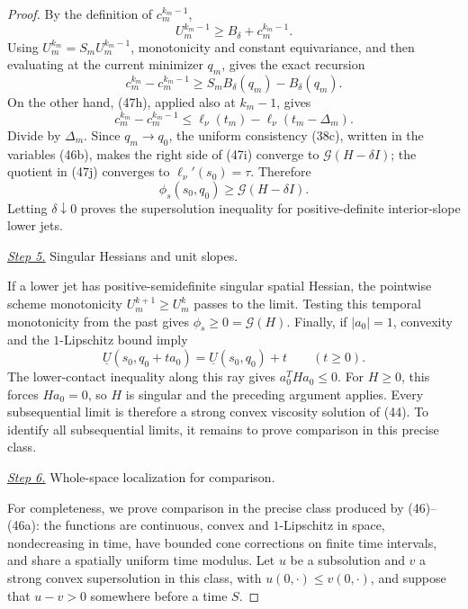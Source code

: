 \documentclass{smfart}
\theoremstyle{definition}
\newcommand{\1}{\mathbf 1}
\begin{document}
\begin{proof}
By the definition of $c_ m^{k_ m-1}$,
\begin{equation*}
U_ m^{k_ m-1}\geq B_ \delta+c_ m^{k_ m-1}.
\end{equation*}
Using $U_ m^{k_ m}=S_ mU_ m^{k_ m-1}$, monotonicity and constant
equivariance, and then evaluating at the current minimizer $q_ m$,
gives the exact recursion
\begin{equation}
c_ m^{k_ m}-c_ m^{k_ m-1}
\geq S_ mB_ \delta(q_ m)-B_ \delta(q_ m).
\tag{47i}
\end{equation}
On the other hand, (47h), applied also at $k_ m-1$, gives
\begin{equation}
c_ m^{k_ m}-c_ m^{k_ m-1}
\leq\ell_ \nu(t_ m)-\ell_ \nu(t_ m-\Delta_ m).
\tag{47j}
\end{equation}
Divide by $\Delta_ m$.  Since $q_ m\to q_ 0$, the uniform consistency
(38c), written in the variables (46b), makes the right side of (47i)
converge to $\mathcal G(H-\delta I)$; the quotient in (47j) converges to
$\ell_ \nu'(s_ 0)=\tau$.  Therefore
\begin{equation*}
\phi_ s(s_ 0,q_ 0)\geq \mathcal G(H-\delta I).
\end{equation*}
Letting $\delta\downarrow0$ proves the supersolution inequality for
positive-definite interior-slope lower jets.

\smallskip\noindent
\underline{\textit{Step 5.}} Singular Hessians and unit slopes.

If a lower jet has positive-semidefinite singular spatial Hessian, the
pointwise scheme monotonicity $U_ m^{k+1}\geq U_ m^k$ passes to the
limit.  Testing this temporal monotonicity from the past gives
$\phi_ s\geq0=\mathcal G(H)$.  Finally, if $|a_ 0|=1$, convexity and the
$1$-Lipschitz bound imply
\begin{equation*}
\underline U(s_ 0,q_ 0+ta_ 0)=\underline U(s_ 0,q_ 0)+t
\qquad(t\geq0).
\end{equation*}
The lower-contact inequality along this ray gives
$a_ 0^THa_ 0\leq0$.  For $H\geq0$, this forces $Ha_ 0=0$, so $H$
is singular and the preceding argument applies.  Every subsequential
limit is therefore a strong convex viscosity solution of (44).  To
identify all subsequential limits, it remains to prove comparison in
this precise class.

\smallskip\noindent
\underline{\textit{Step 6.}} Whole-space localization for comparison.

For completeness, we prove comparison in the precise class produced by
(46)--(46a): the functions are continuous, convex and $1$-Lipschitz
in space, nondecreasing in time, have bounded cone corrections on
finite time intervals, and share a spatially uniform time modulus.
Let $u$ be a subsolution and $v$ a strong convex supersolution in
this class, with $u(0,\cdot)\leq v(0,\cdot)$, and suppose that
$u-v>0$ somewhere before a time $S$.


\end{proof}
\end{document}
